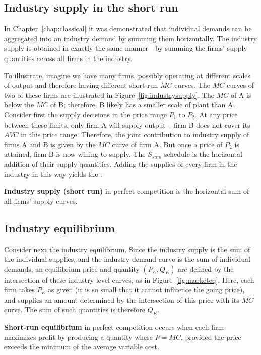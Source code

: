 \newhtmlpage

\subsection*{Industry supply in the short run}

In Chapter~\ref{chap:classical} it was demonstrated that individual demands
can be aggregated into an industry demand by summing them horizontally. The
industry supply is obtained in exactly the same manner---by summing the
firms' supply quantities across all firms in the industry.

To illustrate, imagine we have many firms, possibly operating at different
scales of output and therefore having different short-run $MC$ curves. The 
$MC$ curves of two of these firms are illustrated in Figure~\ref{fig:industrysupply}. 
The $MC$ of A is below the $MC$ of B; therefore, B
likely has a smaller scale of plant than A. Consider first the supply
decisions in the price range $P_1$ to $P_2$. At any price between these
limits, only firm A will supply output -- firm B does not cover its $AVC$ in
this price range. Therefore, the joint contribution to industry supply of
firms A and B is given by the $MC$ curve of firm A. But once a price of $P_2$
is attained, firm B is now willing to supply. The $S_{sum}$ schedule is the
horizontal addition of their supply quantities. Adding the supplies of every
firm in the industry in this way yields the .

\begin{DefBox}
	\textbf{Industry supply (short run)} in perfect competition is the horizontal sum of all firms' supply curves.
\end{DefBox}



\newhtmlpage



\newhtmlpage

\subsection*{Industry equilibrium}

Consider next the industry equilibrium. Since the industry supply is the sum
of the individual supplies, and the industry demand curve is the sum of
individual demands, an equilibrium price and quantity $(P_E,Q_E)$ are
defined by the intersection of these industry-level curves, as in 
Figure~\ref{fig:marketeq}. Here, each firm takes $P_E$ as given (it is so small that it
cannot influence the going price), and supplies an amount determined by the
intersection of this price with its $MC$ curve. The sum of such quantities
is therefore $Q_E$.

\begin{DefBox}
	\textbf{Short-run equilibrium} in perfect competition occurs when each firm maximizes profit by producing a quantity where $P=MC$, provided the price exceeds the minimum of the average variable cost.
\end{DefBox}




